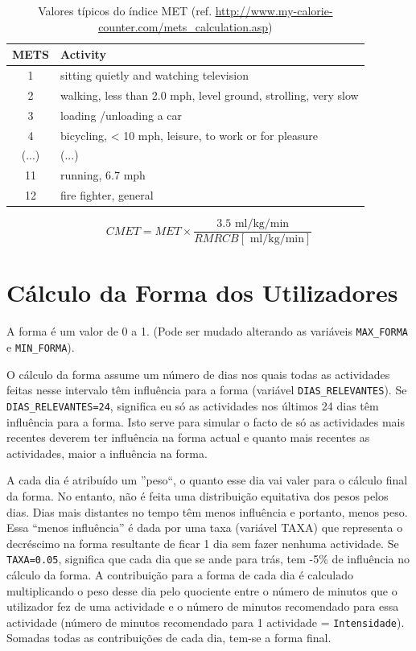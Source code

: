 \documentclass[a4paper,10pt]{report}
\begin{document}
\begin{table}
\caption {Valores típicos do índice MET (ref. \url{http://www.my-calorie-counter.com/mets_calculation.asp})} 
\label{tab:met}
\begin{center}
  \begin{tabular}{| c | l |}
    \hline                       
    METS & Activity\\
    \hline  
    \hline  
    1 & sitting quietly and watching television \\
    \hline  
    2 & walking, less than 2.0 mph, level ground, strolling, very slow \\
    \hline  
    3 & loading /unloading a car\\
    \hline  
    4 & bicycling, < 10 mph, leisure, to work or for pleasure\\
    \hline  
    (...) & (...)\\
    \hline  
    11 & running, 6.7 mph\\
    \hline  
    12 & fire fighter, general\\
    \hline  
  \end{tabular}
\end{center}
\end{table}

\begin{equation} \label{eq:CMET} 
CMET = MET \times \frac{3.5 \text{ ml/kg/min}}{RMRCB [\text{ ml/kg/min}]}
\end{equation}

\chapter{Cálculo da Forma dos Utilizadores}
\label{cap:forma}
A forma é um valor de 0 a 1. (Pode ser mudado alterando as variáveis \verb!MAX_FORMA! e \verb!MIN_FORMA!).

O cálculo da forma assume um número de dias nos quais todas as actividades feitas nesse intervalo têm influência para a forma 
(variável \verb!DIAS_RELEVANTES!). Se \verb!DIAS_RELEVANTES=24!, significa eu só as actividades nos últimos 24 dias têm influência para a forma.  
Isto serve para simular o facto de só as actividades mais recentes deverem ter influência na forma actual e quanto mais recentes as 
actividades, maior a influência na forma.

A cada dia é atribuído um ''peso``, o quanto esse dia vai valer para o cálculo final da forma. 
No entanto, não é feita uma distribuição equitativa dos pesos pelos dias. Dias mais distantes no tempo têm menos influência e portanto, 
menos peso. Essa “menos influência” é dada por uma taxa (variável TAXA) que representa o decréscimo na forma resultante de ficar 1 dia sem 
fazer nenhuma actividade. Se \verb!TAXA=0.05!, significa que cada dia que se ande para trás, tem -5\% de influência no cálculo da forma.
A contribuição para a forma de cada dia é calculado multiplicando o peso desse dia pelo quociente entre o número de minutos que o utilizador 
fez de uma actividade e o número de minutos recomendado para essa actividade (número de minutos recomendado para 1 actividade = \verb!Intensidade!). 
Somadas todas as contribuições de cada dia, tem-se a forma final.
\end{document}
